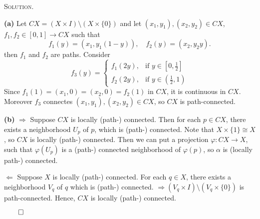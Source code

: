 \documentclass[12pt, a4paper, oneside]{ctexart}
\newenvironment{solution}{%
	\par\noindent\textsc{Solution. }\ignorespaces
}{%
	\hfill$\qed$\par
}
\begin{document}
	\begin{solution}
		
    \textbf{(a)} Let \( CX = (X \times I)\setminus (X \times \{0\})\) and let \( (x_1, y_1), (x_2, y_2) \in CX \), 
    \( f_1, f_2 \in [0,1] \to CX \) such that
    \[
    f_{1}(y) = (x_1, y_1(1 - y)), \quad f_2(y) = (x_2, y_2y).
    \]
    then $f_1$ and $f_2$ are paths. Consider
    \[f_3(y) = \begin{cases}
        f_1(2y), & \text{if } y \in [0, \frac{1}{2}] \\
        f_2(2y), & \text{if } y \in (\frac{1}{2}, 1)
        \end{cases}\]
    Since \( f_1(1) = (x_1, 0) = (x_2, 0) = f_2(1) \) in \( CX \), it is continuous in \( CX \). 
    Moreover $f_3$ connectes \( (x_1, y_1), (x_2, y_2) \in CX \), so \( CX \) is path-connected.

    \textbf{(b)} $\Rightarrow$ Suppose \( CX \) is locally (path-) connected. Then for each \( p \in CX \), 
    there exists a neighborhood \( U_p \) of \( p \), which is (path-) connected. 
    Note that \( X \times \{1\} \cong X \), so \( CX \) is locally (path-) connected.
    Then we can put a projection \( \varphi : CX \to X \), such that \( \varphi(U_p) \) is 
    a (path-) connected neighborhood of \( \varphi(p) \), so \( \alpha \) is (locally path-) connected.


    $\Leftarrow$ Suppose \( X \) is locally (path-) connected. For each \( q \in X \), 
    there exists a neighborhood \( V_q \) of \( q \) which is (path-) connected. $\Rightarrow (V_q \times I)\setminus (V_q \times \{0\})$
    is path-connected. Hence, \( CX \) is locally (path-) connected.

	\end{solution}
\end{document}
